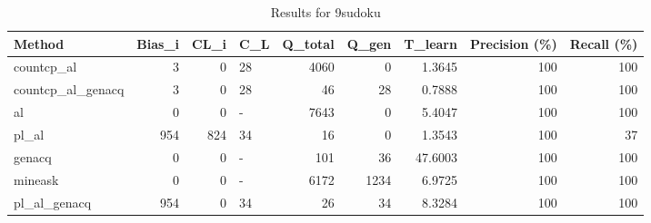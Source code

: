 \begin{table}[ht]
\caption{Results for 9sudoku}
\begin{tabular}{lrrlrrrrr}
\hline
 Method            &   Bias\_i &   CL\_i & C\_L   &   Q\_total &   Q\_gen &   T\_learn &   Precision (\%) &   Recall (\%) \\
\hline
 countcp\_al        &        3 &      0 & 28    &      4060 &       0 &    1.3645 &             100 &          100 \\
 countcp\_al\_genacq &        3 &      0 & 28    &        46 &      28 &    0.7888 &             100 &          100 \\
 al                &        0 &      0 & -     &      7643 &       0 &    5.4047 &             100 &          100 \\
 pl\_al             &      954 &    824 & 34    &        16 &       0 &    1.3543 &             100 &           37 \\
 genacq            &        0 &      0 & -     &       101 &      36 &   47.6003 &             100 &          100 \\
 mineask           &        0 &      0 & -     &      6172 &    1234 &    6.9725 &             100 &          100 \\
 pl\_al\_genacq      &      954 &      0 & 34    &        26 &      34 &    8.3284 &             100 &          100 \\
\hline
\end{tabular}
\end{table}